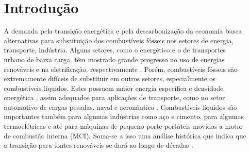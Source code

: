 \section{Introdução} \label{sec:intro}





A demanda pela transição energética e pela descarbonização da economia busca alternativas para substituição dos combustíveis fósseis nos setores de energia, transporte, indústria. 
Alguns setores, como o energético e o de transportes urbano de baixa carga, têm mostrado grande progresso no uso de energias renováveis e na eletrificação, respectivamente \cite{MasriA2021}. 
Porém, combustíveis fósseis são extremamente difíceis de substituir em outros setores, especialmente os combustíveis líquidos.
Estes possuem maior energia específica e densidade energética \cite{Bergthorson2017,Julien2017}, assim adequados para aplicações de transporte, como no setor automotivo de cargas pesadas, naval e aeronáutico \cite{MasriA2021}.
Combustíveis líquidos são importantes também para algumas indústrias como aço e cimento, para algumas termoelétricas e até para máquinas de pequeno porte portáteis movidas a motor de combustão interna (MCI).
Soma-se a isso uma análise histórica que indica que a transição para fontes renováveis se dará ao longo de décadas \cite{MasriA2021}.



